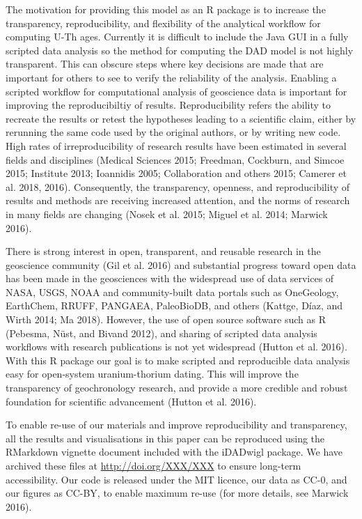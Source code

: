 \documentclass[]{elsarticle} %
\begin{document}
The motivation for providing this model as an R package is to increase the transparency, reproducibility, and flexibility of the analytical workflow for computing U-Th ages. Currently it is difficult to include the Java GUI in a fully scripted data analysis so the method for computing the DAD model is not highly transparent. This can obscure steps where key decisions are made that are important for others to see to verify the reliability of the analysis. Enabling a scripted workflow for computational analysis of geoscience data is important for improving the reproducibiltiy of results. Reproducibility refers the ability to recreate the results or retest the hypotheses leading to a scientific claim, either by rerunning the same code used by the original authors, or by writing new code. High rates of irreproducibility of research results have been estimated in several fields and disciplines (Medical Sciences 2015; Freedman, Cockburn, and Simcoe 2015; Institute 2013; Ioannidis 2005; Collaboration and others 2015; Camerer et al. 2018, 2016). Consequently, the transparency, openness, and reproducibility of results and methods are receiving increased attention, and the norms of research in many fields are changing (Nosek et al. 2015; Miguel et al. 2014; Marwick 2016).

There is strong interest in open, transparent, and reusable research in the geoscience community (Gil et al. 2016) and substantial progress toward open data has been made in the geosciences with the widespread use of data services of NASA, USGS, NOAA and community-built data portals such as OneGeology, EarthChem, RRUFF, PANGAEA, PaleoBioDB, and others (Kattge, Díaz, and Wirth 2014; Ma 2018). However, the use of open source software such as R (Pebesma, Nüst, and Bivand 2012), and sharing of scripted data analysis workflows with research publications is not yet widespread (Hutton et al. 2016). With this R package our goal is to make scripted and reproducible data analysis easy for open-system uranium-thorium dating. This will improve the transparency of geochronology research, and provide a more credible and robust foundation for scientific advancement (Hutton et al. 2016).

To enable re-use of our materials and improve reproducibility and transparency, all the results and visualisations in this paper can be reproduced using the RMarkdown vignette document included with the iDADwigl package. We have archived these files at \url{http://doi.org/XXX/XXX} to ensure long-term accessibility. Our code is released under the MIT licence, our data as CC-0, and our figures as CC-BY, to enable maximum re-use (for more details, see Marwick 2016).
\end{document}
